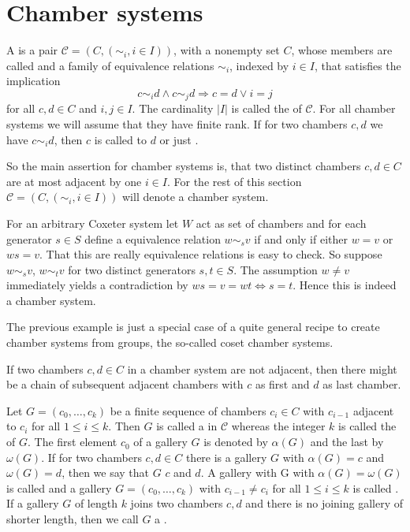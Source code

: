 \section{Chamber systems}

\begin{defi}
	A  is a pair $\mathcal{C} = (C,(\sim_i, i \in I))$, with a nonempty set $C$, whose members are called  and a family of equivalence relations $\sim_i$, indexed by $i \in I$, that satisfies the implication
	$$ c \sim_i d \wedge c \sim_j d \Rightarrow c = d \vee i = j $$
	for all $c,d \in C$ and $i,j \in I$. The cardinality $|I|$ is called the  of $\mathcal{C}$. For all chamber systems we will assume that they have finite rank. If for two chambers $c,d$ we have $c \sim_i d$, then $c$ is called  to $d$ or just .
\end{defi}

So the main assertion for chamber systems is, that two distinct chambers $c,d \in C$ are at most adjacent by one $i \in I$. For the rest of this section $\mathcal{C} = (C,(\sim_i, i \in I))$ will denote a chamber system.

\begin{exam}
	For an arbitrary Coxeter system let $W$ act as set of chambers and for each generator $s \in S$ define a equivalence relation $w \sim_s v$ if and only if either $w = v$ or $ws = v$. That this are really equivalence relations is easy to check. So suppose $w \sim_s v$, $w \sim_t v$ for two distinct generators $s,t \in S$. The assumption $w \neq v$ immediately yields a contradiction by $ws = v = wt \iff s = t$. Hence this is indeed a chamber system.
\end{exam}

The previous example is just a special case of a quite general recipe to create chamber systems from groups, the so-called coset chamber systems.

If two chambers $c,d \in C$ in a chamber system are not adjacent, then there might be a chain of subsequent adjacent chambers with $c$ as first and $d$ as last chamber.

\begin{defi}
	Let $G = (c_0,\ldots,c_k)$ be a finite sequence of chambers $c_i \in C$ with $c_{i-1}$ adjacent to $c_i$ for all $1 \leq i \leq k$. Then $G$ is called a  in $\mathcal{C}$ whereas the integer $k$ is called the  of $G$. The first element $c_0$ of a gallery $G$ is denoted by $\alpha(G)$ and the last by $\omega(G)$. If for two chambers $c,d \in C$ there is a gallery $G$ with $\alpha(G) = c$ and $\omega(G) = d$, then we say that $G$  $c$ and $d$. A gallery with G with $\alpha(G) = \omega(G)$ is called  and a gallery $G = (c_0,\ldots,c_k)$ with $c_{i-1} \neq c_i$ for all $1 \leq i \leq k$ is called . If a gallery $G$ of length $k$ joins two chambers $c,d$ and there is no joining gallery of shorter length, then we call $G$ a .
\end{defi}


